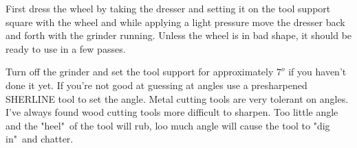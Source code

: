 First dress the wheel by taking the dresser and setting it on the tool support
square with the wheel and while applying a light pressure move the dresser back
and forth with the grinder running. Unless the wheel is in bad shape, it should
be ready to use in a few passes.


Turn off the grinder and set the tool support for approximately $7^{o}$ if you
haven't done it yet. If you're not good at guessing at angles use a presharpened
SHERLINE tool to set the angle. Metal cutting tools are very tolerant on angles.
I've always found wood cutting tools more difficult to sharpen. Too little angle
and the "heel"\ of the tool will rub, loo much angle will cause the tool to "dig
in"\ and chatter.



\secup

\secup

